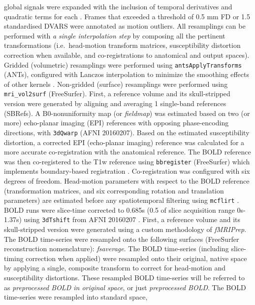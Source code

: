 \documentclass[]{article}
\begin{document}
\begin{description}
global signals were expanded with the inclusion of temporal derivatives
and quadratic terms for each \citep{confounds_satterthwaite_2013}.
Frames that exceeded a threshold of 0.5 mm FD or 1.5 standardised DVARS
were annotated as motion outliers. All resamplings can be performed with
\emph{a single interpolation step} by composing all the pertinent
transformations (i.e.~head-motion transform matrices, susceptibility
distortion correction when available, and co-registrations to anatomical
and output spaces). Gridded (volumetric) resamplings were performed
using \texttt{antsApplyTransforms} (ANTs), configured with Lanczos
interpolation to minimize the smoothing effects of other kernels
\citep{lanczos}. Non-gridded (surface) resamplings were performed using
\texttt{mri\_vol2surf} (FreeSurfer). First, a reference volume and its
skull-stripped version were generated by aligning and averaging 1
single-band references (SBRefs). A B0-nonuniformity map (or
\emph{fieldmap}) was estimated based on two (or more) echo-planar
imaging (EPI) references with opposing phase-encoding directions, with
\texttt{3dQwarp} \citet{afni} (AFNI 20160207). Based on the estimated
susceptibility distortion, a corrected EPI (echo-planar imaging)
reference was calculated for a more accurate co-registration with the
anatomical reference. The BOLD reference was then co-registered to the
T1w reference using \texttt{bbregister} (FreeSurfer) which implements
boundary-based registration \citep{bbr}. Co-registration was configured
with six degrees of freedom. Head-motion parameters with respect to the
BOLD reference (transformation matrices, and six corresponding rotation
and translation parameters) are estimated before any spatiotemporal
filtering using \texttt{mcflirt} \citep[FSL 5.0.9,][]{mcflirt}. BOLD
runs were slice-time corrected to 0.685s (0.5 of slice acquisition range
0s-1.37s) using \texttt{3dTshift} from AFNI 20160207
\citep[RRID:SCR\_005927]{afni}. First, a reference volume and its
skull-stripped version were generated using a custom methodology of
\emph{fMRIPrep}. The BOLD time-series were resampled onto the following
surfaces (FreeSurfer reconstruction nomenclature): \emph{fsaverage}. The
BOLD time-series (including slice-timing correction when applied) were
resampled onto their original, native space by applying a single,
composite transform to correct for head-motion and susceptibility
distortions. These resampled BOLD time-series will be referred to as
\emph{preprocessed BOLD in original space}, or just \emph{preprocessed
BOLD}. The BOLD time-series were resampled into standard space,

\end{description}
\end{document}
